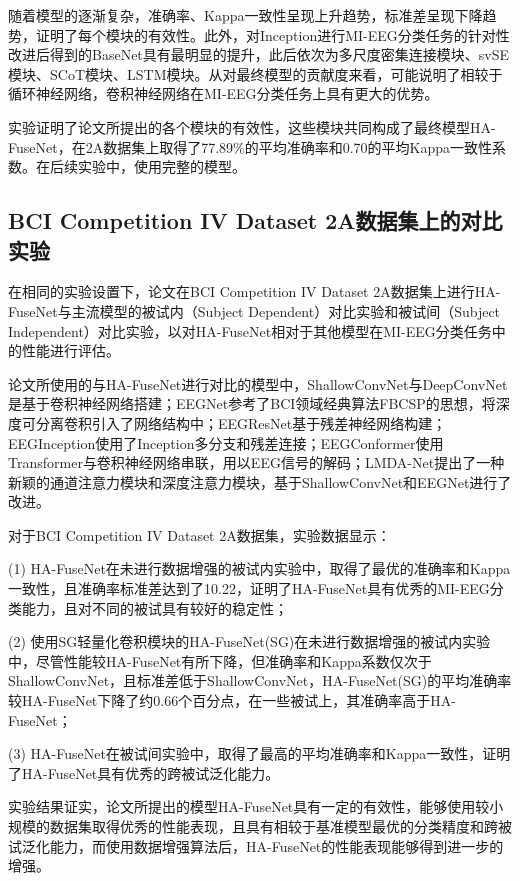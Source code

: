 随着模型的逐渐复杂，准确率、Kappa一致性呈现上升趋势，标准差呈现下降趋势，证明了每个模块的有效性。此外，对Inception进行MI-EEG分类任务的针对性改进后得到的BaseNet具有最明显的提升，此后依次为多尺度密集连接模块、svSE模块、SCoT模块、LSTM模块。从对最终模型的贡献度来看，可能说明了相较于循环神经网络，卷积神经网络在MI-EEG分类任务上具有更大的优势。

实验证明了论文所提出的各个模块的有效性，这些模块共同构成了最终模型HA-FuseNet，在2A数据集上取得了77.89\%的平均准确率和0.70的平均Kappa一致性系数。在后续实验中，使用完整的模型。

\subsection{BCI Competition IV Dataset 2A数据集上的对比实验}

在相同的实验设置下，论文在BCI Competition IV Dataset 2A数据集上进行HA-FuseNet与主流模型的被试内（Subject Dependent）对比实验和被试间（Subject Independent）对比实验，以对HA-FuseNet相对于其他模型在MI-EEG分类任务中的性能进行评估。

论文所使用的与HA-FuseNet进行对比的模型中，ShallowConvNet\cite{schirrmeister2017deep}与DeepConvNet\cite{schirrmeister2017deep}是基于卷积神经网络搭建；EEGNet\cite{lawhern2018eegnet}参考了BCI领域经典算法FBCSP的思想，将深度可分离卷积引入了网络结构中；EEGResNet\cite{HBM:HBM23730}基于残差神经网络\cite{he2016deep}构建；EEGInception\cite{zhang2021eeg}使用了Inception多分支和残差连接；EEGConformer\cite{song2022eeg}使用Transformer\cite{vaswani2017attention}与卷积神经网络串联，用以EEG信号的解码；LMDA-Net\cite{miao2023lmda}提出了一种新颖的通道注意力模块和深度注意力模块，基于ShallowConvNet和EEGNet进行了改进。

对于BCI Competition IV Dataset 2A数据集，实验数据显示：

(1) HA-FuseNet在未进行数据增强的被试内实验中，取得了最优的准确率和Kappa一致性，且准确率标准差达到了10.22，证明了HA-FuseNet具有优秀的MI-EEG分类能力，且对不同的被试具有较好的稳定性；

(2) 使用SG轻量化卷积模块的HA-FuseNet(SG)在未进行数据增强的被试内实验中，尽管性能较HA-FuseNet有所下降，但准确率和Kappa系数仅次于ShallowConvNet，且标准差低于ShallowConvNet，HA-FuseNet(SG)的平均准确率较HA-FuseNet下降了约0.66个百分点，在一些被试上，其准确率高于HA-FuseNet；

(3) HA-FuseNet在被试间实验中，取得了最高的平均准确率和Kappa一致性，证明了HA-FuseNet具有优秀的跨被试泛化能力。

实验结果证实，论文所提出的模型HA-FuseNet具有一定的有效性，能够使用较小规模的数据集取得优秀的性能表现，且具有相较于基准模型最优的分类精度和跨被试泛化能力，而使用数据增强算法后，HA-FuseNet的性能表现能够得到进一步的增强。

